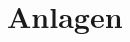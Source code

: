 \documentclass[a4paper, parskip=half]{scrartcl}
\begin{document}
\myTitlepage
\tableofcontents
\newpage

	

\newpage

	

\newpage
	
	
\newpage


\newpage


\newpage
\section{Anlagen}
\end{document}
